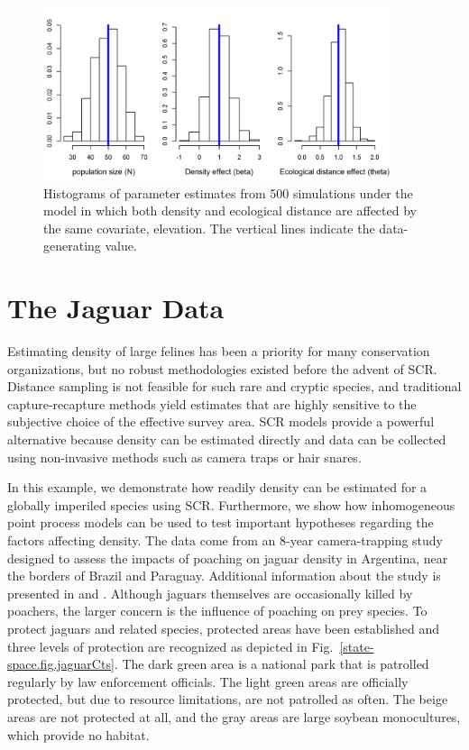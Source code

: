 \begin{figure}[ht]
\centering
\includegraphics[width=4in,height=2in]{Ch11/figs/scrDEDsim}
\caption{Histograms of parameter estimates from 500 simulations under
  the model in which both density and ecological distance are affected
by the same covariate, elevation. The vertical lines indicate the
data-generating value.}
\label{ch9.fig.sim}
\end{figure}




\section{The Jaguar Data}

Estimating density of large felines has been a priority for many
conservation organizations, but no robust methodologies existed before
the advent of SCR. Distance sampling is not feasible for such rare and
cryptic species, and traditional capture-recapture methods yield
estimates that are highly sensitive to the subjective choice of the
effective survey area. SCR models provide a powerful alternative
because density can be estimated directly and data can be collected
using non-invasive methods such as camera traps or hair snares.

In this example, we demonstrate how readily density can be estimated
for a globally imperiled species using SCR. Furthermore, we show how
inhomogeneous point process models can be used to test important
hypotheses regarding the factors affecting density.
The data come from an 8-year camera-trapping study designed to assess the impacts of poaching
on jaguar density in Argentina, near the borders of Brazil and
Paraguay. Additional information about the study is presented in
\citet{paviolo_etal:2008} and \citet{paviolo_etal:2009}. Although
jaguars themselves are occasionally killed by
poachers, the larger concern is the influence of poaching on prey
species. To protect jaguars and related species, protected areas have
been established and three levels of protection are
recognized as depicted in Fig.~\ref{state-space.fig.jaguarCts}. The dark green
area is a national park that is patrolled regularly by law enforcement
officials. The light green areas are officially protected, but due to
resource limitations, are not patrolled as often. The beige areas are
not protected at all, and the gray areas are large soybean
monocultures, which provide no habitat.


